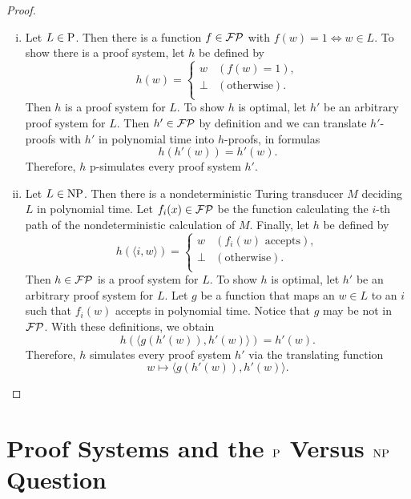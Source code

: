   \begin{proof}
    \begin{enumerate}[(i)]
      \item 
        Let \(L \in \P\). Then there is a function \(f \in \FP\) with \(f(w) = 1 \Leftrightarrow w \in L\). To show there is a proof system, let \(h\) be defined by
        \[
          h(w) =
          \begin{cases}
            w & (f(w) = 1), \\
            \perp & (\text{otherwise}). \\
          \end{cases}
        \]
        Then \(h\) is a proof system for \(L\). To show \(h\) is optimal, let \(h'\) be an arbitrary proof system for \(L\). Then \(h' \in \FP\) by definition and we can translate \(h'\)-proofs with \(h'\) in polynomial time into \(h\)-proofs, in formulas
        \[
          h(h'(w)) = h'(w).
        \]
        Therefore, \(h\) p-simulates every proof system \(h'\).
      \item
        Let \(L \in \NP\). Then there is a nondeterministic Turing transducer \(M\) deciding \(L\) in polynomial time. Let \(f_i(x) \in \FP\) be the function calculating the \(i\)-th path of the nondeterministic calculation of \(M\). Finally, let \(h\) be defined by
        \[
          h(\langle i, w \rangle) =
          \begin{cases}
            w & (f_i(w) \text{ accepts}), \\
            \perp & (\text{otherwise}). \\
          \end{cases}
        \]
        Then \(h \in \FP\) is a proof system for \(L\). To show \(h\) is optimal, let \(h'\) be an arbitrary proof system for \(L\). Let \(g\) be a function that maps an \(w \in L\) to an \(i\) such that \(f_i(w)\) accepts in polynomial time. Notice that \(g\) may be not in \(\FP\). With these definitions, we obtain
        \[
          h(\langle g(h'(w)), h'(w) \rangle) = h'(w).
        \]
        Therefore, \(h\) simulates every proof system \(h'\) via the translating function
          \[w \mapsto \langle g(h'(w)), h'(w) \rangle.\]
    \end{enumerate}
  \end{proof}
  
  \section{Proof Systems and the $\P$ Versus $\NP$ Question}  

